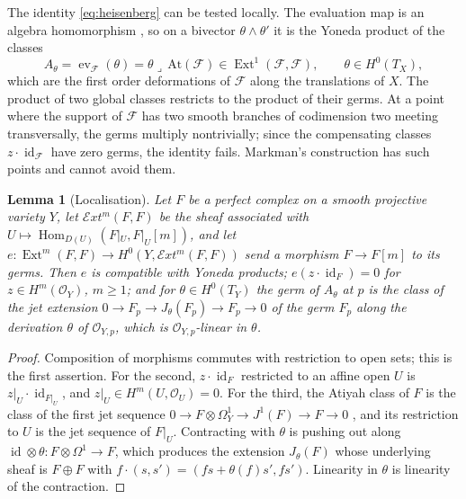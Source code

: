\documentclass[11pt,reqno]{amsart}
\theoremstyle{plain}
\newtheorem{lemma}[theorem]{Lemma}
\theoremstyle{definition}
\theoremstyle{remark}
\newcommand{\cF}{\mathcal{F}}
\newcommand{\cE}{\mathcal{E}}
\newcommand{\cO}{\mathcal{O}}
\DeclareMathOperator{\Hom}{Hom}
\DeclareMathOperator{\Ext}{Ext}
\DeclareMathOperator{\id}{id}
\begin{document}
The identity \eqref{eq:heisenberg} can be tested locally. The evaluation map
is an algebra homomorphism \cite[(8.3.3)]{Mar25a}, so on a bivector
$\theta\wedge\theta'$ it is the Yoneda product of the classes
\[
  A_{\theta}=\operatorname{ev}_{\cF}(\theta)=\theta\lrcorner\,\mathrm{At}(\cF)
  \in\Ext^{1}(\cF,\cF),\qquad\theta\in H^{0}(T_{X}),
\]
which are the first order deformations of $\cF$ along the translations of
$X$. The product of two global classes restricts to the product of their
germs. At a point where the support of $\cF$ has two smooth branches of
codimension two meeting transversally, the germs multiply nontrivially;
since the compensating classes $z\cdot\id_{\cF}$ have zero germs, the
identity fails. Markman's construction has such points and cannot avoid
them.

\begin{lemma}[Localisation]\label{lem:edge}
Let $F$ be a perfect complex on a smooth projective variety $Y$, let
$\cE xt^{m}(F,F)$ be the sheaf associated with $U\mapsto\Hom_{D(U)}(F|_{U},F|_{U}[m])$,
and let $e\colon\Ext^{m}(F,F)\to H^{0}(Y,\cE xt^{m}(F,F))$ send a morphism
$F\to F[m]$ to its germs. Then $e$ is compatible with Yoneda products;
$e(z\cdot\id_{F})=0$ for $z\in H^{m}(\cO_{Y})$, $m\ge1$; and for
$\theta\in H^{0}(T_{Y})$ the germ of $A_{\theta}$ at $p$ is the class of the
jet extension $0\to F_{p}\to J_{\theta}(F_{p})\to F_{p}\to0$ of the germ
$F_{p}$ along the derivation $\theta$ of $\cO_{Y,p}$, which is
$\cO_{Y,p}$-linear in $\theta$.
\end{lemma}

\begin{proof}
Composition of morphisms commutes with restriction to open sets; this is the
first assertion. For the second, $z\cdot\id_{F}$ restricted to an affine open
$U$ is $z|_{U}\cdot\id_{F|_{U}}$, and $z|_{U}\in H^{m}(U,\cO_{U})=0$. For the
third, the Atiyah class of $F$ is the class of the first jet sequence
$0\to F\otimes\Omega^{1}_{Y}\to J^{1}(F)\to F\to0$ \cite[Section 3]{BF03},
and its restriction to $U$ is the jet sequence of $F|_{U}$. Contracting with
$\theta$ is pushing out along $\id\otimes\theta\colon F\otimes\Omega^{1}\to F$,
which produces the extension $J_{\theta}(F)$ whose underlying sheaf is
$F\oplus F$ with $f\cdot(s,s')=(fs+\theta(f)s',fs')$. Linearity in $\theta$
is linearity of the contraction.
\end{proof}
\end{document}
